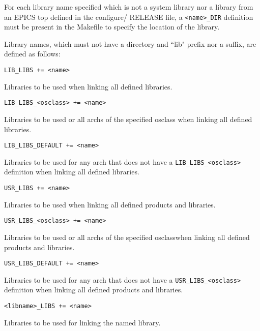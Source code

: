 For each library name specified which is not a system library nor a library from an EPICS top defined in the configure/
RELEASE file, a \verb|<name>_DIR| definition must be present in the Makefile to specify the location of the library. 

Library names, which must not have a directory and ``lib" prefix nor a suffix, are defined as follows:

\begin{description}

\item {}\verb|LIB_LIBS += <name>|

Libraries to be used when linking all defined libraries.

\item \verb|LIB_LIBS_<osclass> += <name>|

Libraries to be used or all archs of the specified osclass when linking all defined libraries.

\item \verb|LIB_LIBS_DEFAULT += <name>|

Libraries to be used for any arch that does not have a \verb|LIB_LIBS_<osclass>| definition when linking all 
defined libraries.

\item

\item {}\verb|USR_LIBS += <name>|

Libraries to be used when linking all defined products and libraries.

\item \verb|USR_LIBS_<osclass> += <name>|

Libraries to be used or all archs of the specified osclasswhen linking all defined products and libraries.

\item \verb|USR_LIBS_DEFAULT += <name>|

Libraries to be used for any arch that does not have a \verb|USR_LIBS_<osclass>| definition when linking all 
defined products and libraries.

\item

\item {}\verb|<libname>_LIBS += <name>|

Libraries to be used for linking the named library.


\end{description}
